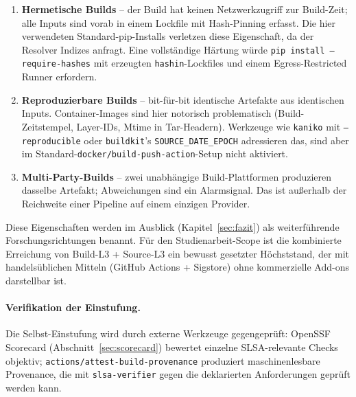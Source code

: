 \documentclass[12pt, a4paper]{scrartcl}
\begin{document}
\begin{enumerate}[leftmargin=1.4em]
  \item \textbf{Hermetische Builds} -- der Build hat keinen
        Netzwerkzugriff zur Build-Zeit; alle Inputs sind vorab in
        einem Lockfile mit Hash-Pinning erfasst. Die hier verwendeten
        Standard-pip-Installs verletzen diese Eigenschaft, da der
        Resolver Indizes anfragt. Eine vollständige Härtung würde
        \texttt{pip install --require-hashes} mit erzeugten
        \texttt{hashin}-Lockfiles und einem Egress-Restricted Runner
        erfordern.
  \item \textbf{Reproduzierbare Builds} -- bit-für-bit identische
        Artefakte aus identischen Inputs. Container-Images sind hier
        notorisch problematisch (Build-Zeitstempel, Layer-IDs, Mtime
        in Tar-Headern). Werkzeuge wie \texttt{kaniko} mit
        \texttt{--reproducible} oder \texttt{buildkit}'s
        \texttt{SOURCE\_DATE\_EPOCH} adressieren das, sind aber im
        Standard-\texttt{docker/build-push-action}-Setup nicht
        aktiviert.
  \item \textbf{Multi-Party-Builds} -- zwei unabhängige
        Build-Plattformen produzieren dasselbe Artefakt; Abweichungen
        sind ein Alarmsignal. Das ist außerhalb der Reichweite einer
        Pipeline auf einem einzigen Provider.
\end{enumerate}

Diese Eigenschaften werden im Ausblick (Kapitel~\ref{sec:fazit}) als
weiterführende Forschungsrichtungen benannt. Für den
Studienarbeit-Scope ist die kombinierte Erreichung von Build-L3 +
Source-L3 ein bewusst gesetzter Höchststand, der mit handelsüblichen
Mitteln (GitHub Actions + Sigstore) ohne kommerzielle Add-ons
darstellbar ist.

\paragraph{Verifikation der Einstufung.}
Die Selbst-Einstufung wird durch externe Werkzeuge gegengeprüft:
OpenSSF Scorecard (Abschnitt~\ref{sec:scorecard}) bewertet einzelne
SLSA-relevante Checks objektiv;
\texttt{actions/attest-build-provenance} produziert maschinenlesbare
Provenance, die mit \texttt{slsa-verifier} gegen die deklarierten
Anforderungen geprüft werden kann.
\end{document}
